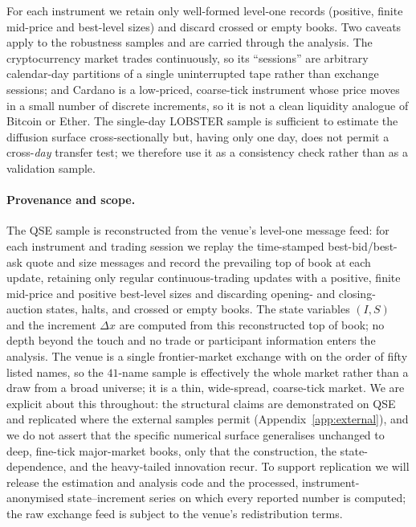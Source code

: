 \documentclass[11pt]{article}
\theoremstyle{plain}
\theoremstyle{definition}
\begin{document}
For each instrument we retain only well-formed level-one records (positive,
finite mid-price and best-level sizes) and discard crossed or empty books. Two
caveats apply to the robustness samples and are carried through the analysis. The
cryptocurrency market trades continuously, so its ``sessions'' are arbitrary
calendar-day partitions of a single uninterrupted tape rather than exchange
sessions; and Cardano is a low-priced, coarse-tick instrument whose price moves in
a small number of discrete increments, so it is not a clean liquidity analogue of
Bitcoin or Ether. The single-day LOBSTER sample is sufficient to estimate the
diffusion surface cross-sectionally but, having only one day, does not permit a
cross-\emph{day} transfer test; we therefore use it as a consistency check rather
than as a validation sample.

\paragraph{Provenance and scope.}
The QSE sample is reconstructed from the venue's level-one message feed: for each instrument
and trading session we replay the time-stamped best-bid/best-ask quote and size messages and
record the prevailing top of book at each update, retaining only regular continuous-trading
updates with a positive, finite mid-price and positive best-level sizes and discarding
opening- and closing-auction states, halts, and crossed or empty books. The state variables
$(I,S)$ and the increment $\Delta x$ are computed from this reconstructed top of book; no
depth beyond the touch and no trade or participant information enters the analysis. The venue
is a single frontier-market exchange with on the order of fifty listed names, so the $41$-name
sample is effectively the whole market rather than a draw from a broad universe; it is a
thin, wide-spread, coarse-tick market. We are explicit about this throughout: the structural
claims are demonstrated on QSE and replicated where the external samples permit
(Appendix~\ref{app:external}), and we do not assert that the specific numerical surface
generalises unchanged to deep, fine-tick major-market books, only that the construction, the
state-dependence, and the heavy-tailed innovation recur. To support replication we will
release the estimation and analysis code and the processed, instrument-anonymised
state--increment series on which every reported number is computed; the raw exchange feed is
subject to the venue's redistribution terms.
\end{document}
